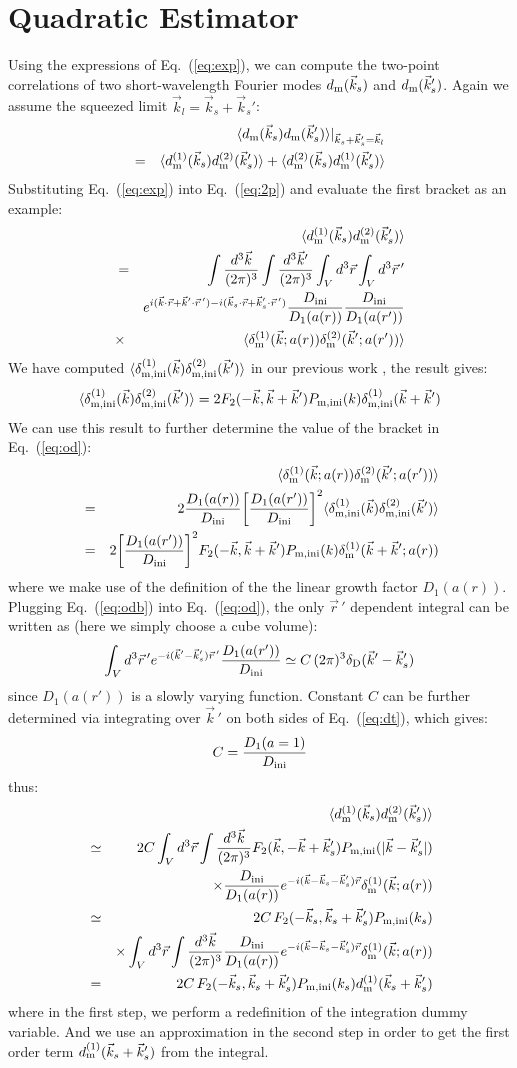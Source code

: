 \documentclass[prd,amsmath,amssymb,floatfix,superscriptaddress,nofootinbib,twocolumn]{revtex4-1}
\def\be{\begin{equation}}
\def\ee{\end{equation}}
\def\bea{\begin{eqnarray}}
\def\eea{\end{eqnarray}}
\newcommand{\ini}{\rm ini}
\newcommand{\vrr}{\vec{r}}
\newcommand{\vs}{\nonumber\\}
\newcommand{\vk}{\vec{k}}
\newcommand{\ec}[1]{Eq.~(\ref{eq:#1})}
\newcommand{\eql}[1]{\label{eq:#1}}
\begin{document}
\section{Quadratic Estimator} \label{sec5}
Using the expressions of \ec{exp}, we can compute the two-point correlations of two short-wavelength Fourier modes $d_{\rm m}(\vk_s)$ and $d_{\rm m}(\vk_s')$. Again we assume the squeezed limit $\vk_l=\vk_s+\vk_s'$:
\bea 
 &&\langle d_{\rm m}(\vk_s)d_{\rm m}(\vk_s') \rangle|_{\vk_s+\vk_s'=\vk_l}\vs
 =&&\langle d^{(1)}_{\rm m}(\vk_s)d^{(2)}_{\rm m}(\vk_s') \rangle+\langle d^{(2)}_{\rm m}(\vk_s)d^{(1)}_{\rm m}(\vk_s') \rangle \vs \eql{2p}
\eea 
Substituting \ec{exp} into \ec{2p} and evaluate the first bracket as an example:
\bea 
&&\langle d^{(1)}_{\rm m}(\vk_s)d^{(2)}_{\rm m}(\vk_s') \rangle \vs 
&=& \int \frac{d^{3}\vk}{(2\pi)^3}\int \frac{d^{3}\vk'}{(2\pi)^3} \int_V d^{3}\vrr\int_{V} d^{3} \vrr\, '\vs
&& e^{i(\vk\cdot\vrr+\vk'\cdot\vrr\, ')-i(\vk_s\cdot\vrr+\vk_s'\cdot\vrr\, ')} \frac{D_{\ini}}{D_{1}(a(r))} \frac{D_{\ini}}{D_{1}(a(r'))}  \vs
&\times &\langle \delta_{\rm m}^{(1)}(\vk;a(r))\delta_{\rm m}^{(2)}(\vk';a(r')) \rangle \eql{od}
\eea 
We have computed $\langle \delta_{\rm m,ini}^{(1)}(\vk)\delta_{\rm m,ini}^{(2)}(\vk') \rangle$ in our previous work \cite{Li:2020fir}, the result gives:
\be
\langle \delta_{\rm m,ini}^{(1)}(\vk)\delta_{\rm m,ini}^{(2)}(\vk') \rangle =2F_{2}(-\vk,\vk+\vk')P_{\rm m,ini}(k)\delta_{\rm m,ini}^{(1)}(\vk+\vk') 
\ee
We can use this result to further determine the value of the bracket in \ec{od}:
\bea 
&&\langle \delta_{\rm m}^{(1)}(\vk;a(r))\delta_{\rm m}^{(2)}(\vk';a(r')) \rangle \vs
&=&2\frac{D_{1}(a(r))}{D_{\ini}}\bigg[\frac{D_{1}(a(r'))}{D_{\ini}} \bigg]^{2}\langle \delta_{\rm m,ini}^{(1)}(\vk)\delta_{\rm m,ini}^{(2)}(\vk') \rangle  \vs 
&=&2\bigg[\frac{D_{1}(a(r'))}{D_{\ini}} \bigg]^{2}F_{2}(-\vk,\vk+\vk')P_{\rm m,\ini}(k)\delta_{\rm m}^{(1)}(\vk+\vk';a(r)) \eql{odb} \vs
\eea 
where we make use of the definition of the the linear growth factor $D_1(a(r))$. Plugging \ec{odb} into \ec{od}, the only $\vrr\, '$ dependent integral can be written as (here we simply choose a cube volume):
\be 
\int_{V} d^{3}\vrr\, 'e^{-i(\vk'-\vk_s')\vrr\, '}\frac{D_{1}(a(r'))}{D_{\ini}}  \simeq C\,(2\pi)^3\delta_{\rm D}(\vk'-\vk_s')\eql{dt}
\ee 
since $D_1(a(r'))$ is a slowly varying function. Constant $C$ can be further determined via integrating over $\vk\, '$ on both sides of \ec{dt}, which gives:
\be 
C=\frac{D_{1}(a=1)}{D_{\rm ini}}
\ee 
thus:
\bea 
&& \langle d^{(1)}_{\rm m}(\vk_s)d^{(2)}_{\rm m}(\vk_s') \rangle \vs 
&\simeq &2C\int_{V} d^{3} \vrr\int \frac{d^{3}\vk}{(2\pi)^3}F_2(\vk,-\vk+\vk_s')P_{\rm m,\ini}(|\vk-\vk_s'|) \vs
&&\times \frac{D_{\ini}}{D_{1}(a(r))}e^{-i(\vk-\vk_s-\vk_s')\vrr}\delta_{\rm m}^{(1)}(\vk;a(r)) \vs
&\simeq & 2C\,F_{2}(-\vk_s,\vk_s+\vk_s')P_{\rm m,\ini}(k_s) \vs
&& \times \int_{V} d^{3} \vrr\int \frac{d^{3}\vk}{(2\pi)^3}\frac{D_{\ini}}{D_{1}(a(r))}e^{-i(\vk-\vk_s-\vk_s')\vrr}\delta_{\rm m}^{(1)}(\vk;a(r))\vs
&= &2C\,F_{2}(-\vk_s,\vk_s+\vk_s')P_{\rm m,\ini}(k_s)d_{\rm m}^{(1)}(\vk_s+\vk_s') \eql{appr}
\eea 
where in the first step, we perform a redefinition of the integration dummy variable. And we use an approximation in the second step in order to get the first order term $d_{\rm m}^{(1)}(\vk_s+\vk'_s)$ from the integral. 
\end{document}
